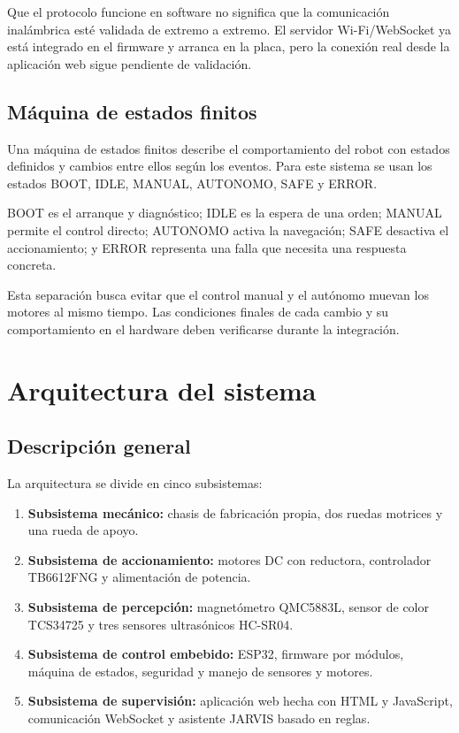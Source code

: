 \documentclass[journal]{IEEEtran}
\begin{document}
Que el protocolo funcione en software no significa que la comunicación inalámbrica esté validada de extremo a extremo. El servidor Wi-Fi/WebSocket ya está integrado en el firmware y arranca en la placa, pero la conexión real desde la aplicación web sigue pendiente de validación.

\subsection{Máquina de estados finitos}

Una máquina de estados finitos describe el comportamiento del robot con estados definidos y cambios entre ellos según los eventos. Para este sistema se usan los estados BOOT, IDLE, MANUAL, AUTONOMO, SAFE y ERROR.

BOOT es el arranque y diagnóstico; IDLE es la espera de una orden; MANUAL permite el control directo; AUTONOMO activa la navegación; SAFE desactiva el accionamiento; y ERROR representa una falla que necesita una respuesta concreta.

Esta separación busca evitar que el control manual y el autónomo muevan los motores al mismo tiempo. Las condiciones finales de cada cambio y su comportamiento en el hardware deben verificarse durante la integración.


\section{Arquitectura del sistema}

\subsection{Descripción general}

La arquitectura se divide en cinco subsistemas:

\begin{enumerate}[1.]
    \item \textbf{Subsistema mecánico:} chasis de fabricación propia, dos ruedas motrices y una rueda de apoyo.

    \item \textbf{Subsistema de accionamiento:} motores DC con reductora, controlador TB6612FNG y alimentación de potencia.

    \item \textbf{Subsistema de percepción:} magnetómetro QMC5883L, sensor de color TCS34725 y tres sensores ultrasónicos HC-SR04.

    \item \textbf{Subsistema de control embebido:} ESP32, firmware por módulos, máquina de estados, seguridad y manejo de sensores y motores.

    \item \textbf{Subsistema de supervisión:} aplicación web hecha con HTML y JavaScript, comunicación WebSocket y asistente JARVIS basado en reglas.
\end{enumerate}
\end{document}
